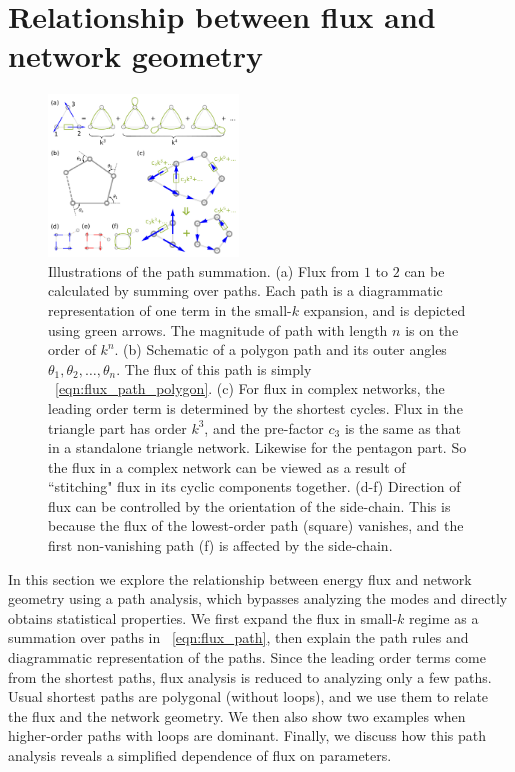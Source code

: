 \documentclass[
 preprint,
 preprintnumbers,
 amsmath,amssymb,
 aps,
 pre,
 longbibliography,
 10pt, twocolumn
]{revtex4-1}
\begin{document}
\section{Relationship between flux and network geometry} \label{sec:path}
\begin{figure}[ht]
	\centering
	\includegraphics[width=0.45\textwidth]{4_path_sum.pdf}
    \caption{Illustrations of the path summation. 
    (a) Flux from $1$ to $2$ can be calculated by summing over paths. Each path is a diagrammatic representation of one term in the small-$k$ expansion, and is depicted using green arrows. The magnitude of path with length $n$ is on the order of $k^n$. 
    (b) Schematic of a polygon path and its outer angles $\theta_1,\theta_2,\dots,\theta_n$. The flux of this path is simply \eqnname~\eqref{eqn:flux_path_polygon}. 
    (c) For flux in complex networks, the leading order term is determined by the shortest cycles. Flux in the triangle part has order $k^3$, and the pre-factor $c_3$ is the same as that in a standalone triangle network. Likewise for the pentagon part. So the flux in a complex network can be viewed as a result of ``stitching" flux in its cyclic components together.
    (d-f) Direction of flux can be controlled by the orientation of the side-chain. This is because the flux of the lowest-order path (square) vanishes, and the first non-vanishing path (f) is affected by the side-chain.
    }
    \label{fig:path_sum}
\end{figure}

In this section we explore the relationship between energy flux and network geometry using a path analysis, which bypasses analyzing the modes and directly obtains statistical properties.
We first expand the flux in small-$k$ regime as a summation over paths in \eqnname~\eqref{eqn:flux_path}, then explain the path rules and diagrammatic representation of the paths.
Since the leading order terms come from the shortest paths, flux analysis is reduced to analyzing only a few paths.
Usual shortest paths are polygonal (without loops), and we use them to relate the flux and the network geometry.
We then also show two examples when higher-order paths with loops are dominant.
Finally, we discuss how this path analysis reveals a simplified dependence of flux on parameters.
\end{document}
